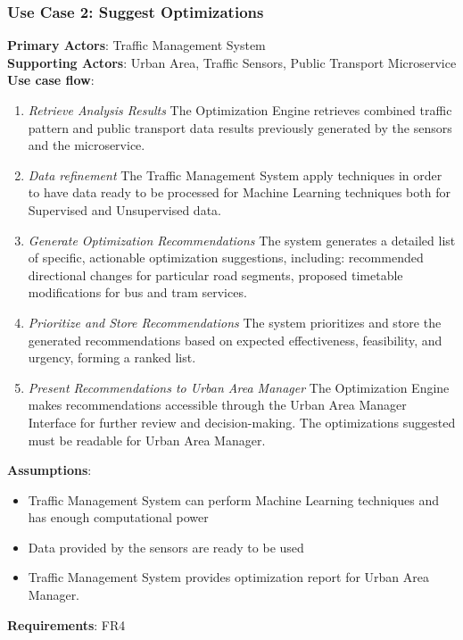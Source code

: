 \documentclass[a4paper,12pt]{article}
\begin{document}
\subsubsection*{Use Case 2: Suggest Optimizations}
\textbf{Primary Actors}: Traffic Management System \\
\textbf{Supporting Actors}:  Urban Area, Traffic Sensors, Public Transport Microservice \\
\textbf{Use case flow}: 
\begin{enumerate}
    \item \textit{Retrieve Analysis Results}
    The Optimization Engine retrieves combined traffic pattern and public transport data results previously generated by the sensors and the microservice.
    \item \textit{Data refinement} The Traffic Management System apply techniques in order to have data ready to be processed for Machine Learning techniques both for Supervised and Unsupervised data.
    \item \textit{Generate Optimization Recommendations} The system generates a detailed list of specific, actionable optimization suggestions, including: recommended directional changes for particular road segments, proposed timetable modifications for bus and tram services.
    \item \textit{Prioritize and Store Recommendations} The system prioritizes and store the generated recommendations based on expected effectiveness, feasibility, and urgency, forming a ranked list.
    \item \textit{Present Recommendations to Urban Area Manager} The Optimization Engine makes recommendations accessible through the Urban Area Manager Interface for further review and decision-making. The optimizations suggested must be readable for Urban Area Manager.
\end{enumerate}
\textbf{Assumptions}: 
\begin{itemize}
    \item Traffic Management System can perform Machine Learning techniques and has enough computational power
    \item Data provided by the sensors are ready to be used
    \item Traffic Management System provides optimization report for Urban Area Manager.
\end{itemize}
\textbf{Requirements}: FR4
\\
\end{document}
